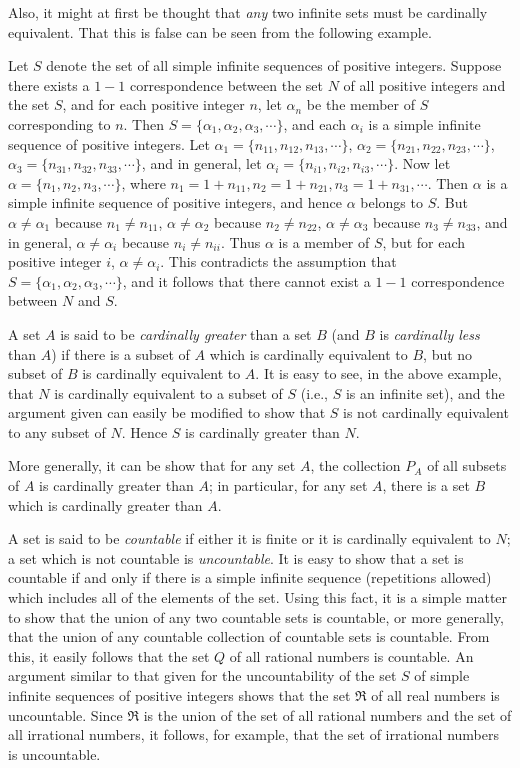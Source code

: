 \documentclass{article}
\begin{document}
Also, it might at first be thought that \emph{any} two infinite sets must be cardinally equivalent. That this is false can be seen from the following example.

Let $S$ denote the set of all simple infinite sequences of positive integers. Suppose there exists a $1-1$ correspondence between the set $N$ of all positive integers and the set $S$, and for each positive integer $n$, let $\alpha_n$ be the member of $S$ corresponding to $n$. Then $S = \{ \alpha_1, \alpha_2, \alpha_3, \cdots \}$, and each $\alpha_i$ is a simple infinite sequence of positive integers. Let $\alpha_1 = \{ n_{11}, n_{12}, n_{13}, \cdots \}$, $\alpha_2 = \{ n_{21}, n_{22}, n_{23}, \cdots \}$, $\alpha_3 = \{ n_{31}, n_{32}, n_{33}, \cdots \}$, and in general, let $\alpha_i = \{ n_{i1}, n_{i2}, n_{i3}, \cdots \}$. Now let $\alpha = \{ n_{1}, n_{2}, n_{3}, \cdots \}$, where $n_1 = 1 + n_{11}, n_2 = 1 + n_{21}, n_3 = 1 + n_{31}, \cdots$. Then $\alpha$ is a simple infinite sequence of positive integers, and hence $\alpha$ belongs to $S$. But $\alpha \neq \alpha_1$ because $n_1 \neq n_{11}$, $\alpha \neq \alpha_2$ because $n_2 \neq n_{22}$, $\alpha \neq \alpha_3$ because $n_3 \neq n_{33}$, and in general, $\alpha \neq \alpha_i$ because $n_i \neq n_{ii}$. Thus $\alpha$ is a member of $S$, but for each positive integer $i$, $\alpha \neq \alpha_i$. This contradicts the assumption that $S = \{ \alpha_1, \alpha_2, \alpha_3, \cdots \}$, and it follows that there cannot exist a $1-1$ correspondence between $N$ and $S$.

A set $A$ is said to be \emph{cardinally greater} than a set $B$ (and $B$ is \emph{cardinally less} than $A$) if there is a subset of $A$ which is cardinally equivalent to $B$, but no subset of $B$ is cardinally equivalent to $A$. It is easy to see, in the above example, that $N$ is cardinally equivalent to a subset of $S$ (i.e., $S$ is an infinite set), and the argument given can easily be modified to show that $S$ is not cardinally equivalent to any subset of $N$. Hence $S$ is cardinally greater than $N$.

More generally, it can be show that for any set $A$, the collection $P_A$ of all subsets of $A$ is cardinally greater than $A$; in particular, for any set $A$, there is a set $B$ which is cardinally greater than $A$.

A set is said to be \emph{countable} if either it is finite or it is cardinally equivalent to $N$; a set which is not countable is \emph{uncountable}. It is easy to show that a set is countable if and only if there is a simple infinite sequence (repetitions allowed) which includes all of the elements of the set. Using this fact, it is a simple matter to show that the union of any two countable sets is countable, or more generally, that the union of any countable collection of countable sets is countable. From this, it easily follows that the set $Q$ of all rational numbers is countable. An argument similar to that given for the uncountability of the set $S$ of simple infinite sequences of positive integers shows that the set $\Re$ of all real numbers is uncountable. Since $\Re$ is the union of the set of all rational numbers and the set of all irrational numbers, it follows, for example, that the set of irrational numbers is uncountable.
\end{document}
